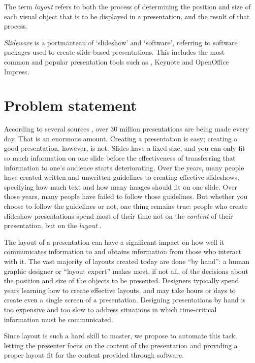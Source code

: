    The term \emph{layout} refers to both the process of determining the
   position and size of each visual object that is to be displayed in a
   presentation, and the result of that process.

   \emph{Slideware} is a portmanteau of `slideshow' and `software', referring
   to software packages used to create slide-based presentations. This includes
   the most common and popular presentation tools such as \ppt, Keynote and
   OpenOffice Impress.

  \section{Problem statement}

   According to several sources \citep{parker-1, drucker-1, bajaj-1}, over 30
   million \ppt presentations are being made every day. That is an enormous
   amount. Creating a \ppt presentation is easy; creating a good \ppt
   presentation, however, is not. Slides have a fixed size, and you can only
   fit so much information on one slide before the effectiveness of
   transferring that information to one's audience starts deteriorating. Over
   the years, many people have created written and unwritten guidelines to
   creating effective slideshows, specifying how much text and how many images
   should fit on one slide. Over those years, many people have failed to follow
   those guidelines. But whether you choose to follow the guidelines or
   not, one thing remains true: people who create slideshow presentations spend
   most of their time not on the \emph{content} of their presentation, but on the
   \emph{layout} \citep{lok-1}.

   The layout of a presentation can have a significant impact on how well it
   communicates information to and obtains information from those who interact
   with it. The vast majority of layouts created today are done ``by hand'': a
   human graphic designer or ``layout expert'' makes most, if not all, of the
   decisions about the position and size of the objects to be presented.
   Designers typically spend years learning how to create effective layouts,
   and may take hours or days to create even a single screen of a presentation.
   Designing presentations by hand is too expensive and too slow to address
   situations in which time-critical information must be communicated.

   Since layout is such a hard skill to master, we propose to automate this
   task, letting the presenter focus on the content of the presentation and
   providing a proper layout fit for the content provided through software.

